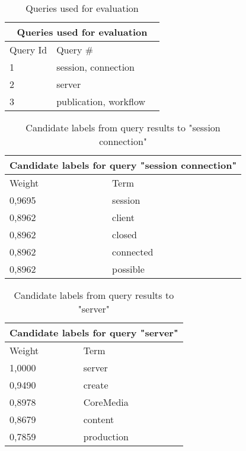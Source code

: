 \begin{table}[H]
\centering
\begin{tabular}{l l  c}
\hline
\multicolumn{3}{c}{Queries used for evaluation}\\
\hline
Query Id & Query \# \\
\hline
1 & session, connection  \\
2 & server  \\
3 & publication, workflow  \\
\hline
\end{tabular}
\caption[Queries used for evaluation]{Queries used for evaluation}
\end{table}

\begin{table}[!ht]
\centering
\begin{tabular}{l l}
\hline
\multicolumn{2}{c}{Candidate labels for query "session connection"}\\
\hline
Weight & Term \\
\hline
0,9695 & session  \\
0,8962 & client  \\
 0,8962 & closed  \\
0,8962 & connected \\
0,8962 & possible \\
\hline
\end{tabular}
\caption[Candidate labels from query results to "session connection"]{Candidate labels from query results to "session connection"}
\end{table}


\begin{table}[!ht]
\centering
\begin{tabular}{l l}
\hline
\multicolumn{2}{c}{Candidate labels for query "server"}\\
\hline
Weight & Term \\
\hline
1,0000 & server  \\
 0,9490 & create  \\
0,8978 & CoreMedia  \\
0,8679 & content \\
0,7859 & production \\
\hline
\end{tabular}
\caption[Candidate labels from query results to "server"]{Candidate labels from query results to "server"}
\end{table}




